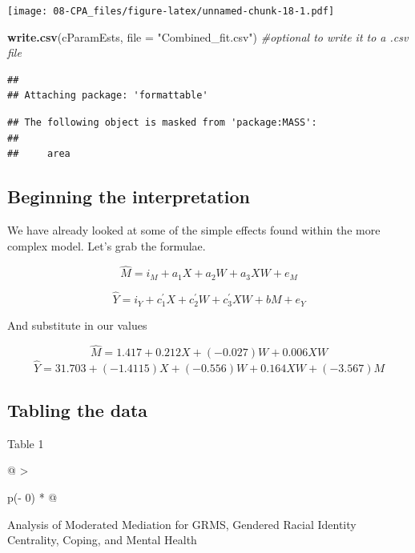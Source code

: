 \documentclass[
  11pt,
]{book}
\newenvironment{Shaded}{\begin{snugshade}}{\end{snugshade}}
\newcommand{\AttributeTok}[1]{\textcolor[rgb]{0.27,0.27,0.27}{#1}}
\newcommand{\CommentTok}[1]{\textcolor[rgb]{0.37,0.37,0.37}{\textit{#1}}}
\newcommand{\FunctionTok}[1]{\textcolor[rgb]{0.27,0.27,0.27}{\textbf{#1}}}
\newcommand{\NormalTok}[1]{#1}
\newcommand{\StringTok}[1]{\textcolor[rgb]{0.5,0.5,0.5}{#1}}
\begin{document}
\texttt{[image: 08-CPA\_files/figure-latex/unnamed-chunk-18-1.pdf]}

\begin{Shaded}
\begin{Highlighting}[]
\FunctionTok{write.csv}\NormalTok{(cParamEsts, }\AttributeTok{file =} \StringTok{"Combined\_fit.csv"}\NormalTok{)  }\CommentTok{\#optional to write it to a .csv file}
\end{Highlighting}
\end{Shaded}

\begin{verbatim}
## 
## Attaching package: 'formattable'
\end{verbatim}

\begin{verbatim}
## The following object is masked from 'package:MASS':
## 
##     area
\end{verbatim}

\hypertarget{beginning-the-interpretation}{%
\subsection{Beginning the interpretation}\label{beginning-the-interpretation}}

We have already looked at some of the simple effects found within the more complex model. Let's grab the formulae.

\[\hat{M} = i_{M}+a_{1}X + a_{2}W + a_{3}XW + e_{M}\]

\[\hat{Y} = i_{Y}+c_{1}^{'}X+ c_{2}^{'}W+c_{3}^{'}XW+ bM+e_{Y}\]

And substitute in our values

\[\hat{M} = 1.417 + 0.212X + (-0.027) W + 0.006XW\] \[\hat{Y} = 31.703 + (-1.4115)X + (-0.556)W + 0.164XW + (-3.567)M\]

\hypertarget{tabling-the-data-1}{%
\subsection{Tabling the data}\label{tabling-the-data-1}}

Table 1

\begin{longtable}[]{@{}
  >{\raggedright\arraybackslash}p{(\columnwidth - 0\tabcolsep) * }@{}}
\toprule\noalign{}
\begin{minipage}[b]{\linewidth}\raggedright
Analysis of Moderated Mediation for GRMS, Gendered Racial Identity Centrality, Coping, and Mental Health
\end{minipage} \\
\midrule\noalign{}
\endhead
\bottomrule\noalign{}
\endlastfoot
\end{longtable}
\end{document}
